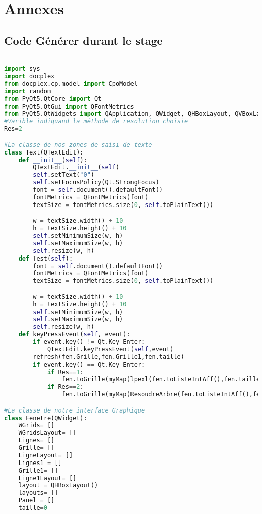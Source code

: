 \chapter{Annexes}

\section{Code Générer durant le stage}

\begin{lstlisting}[language=Python]

import sys
import docplex
from docplex.cp.model import CpoModel
import random
from PyQt5.QtCore import Qt
from PyQt5.QtGui import QFontMetrics
from PyQt5.QtWidgets import QApplication, QWidget, QHBoxLayout, QVBoxLayout, QLabel, QTextEdit
#Varible indiquand la méthode de resolution choisie
Res=2

#La classe de nos zones de saisi de texte
class Text(QTextEdit):
    def __init__(self):
        QTextEdit.__init__(self)
        self.setText("0")
        self.setFocusPolicy(Qt.StrongFocus)
        font = self.document().defaultFont()
        fontMetrics = QFontMetrics(font)
        textSize = fontMetrics.size(0, self.toPlainText())

        w = textSize.width() + 10
        h = textSize.height() + 10
        self.setMinimumSize(w, h)
        self.setMaximumSize(w, h)
        self.resize(w, h)
    def Test(self):
        font = self.document().defaultFont()
        fontMetrics = QFontMetrics(font)
        textSize = fontMetrics.size(0, self.toPlainText())

        w = textSize.width() + 10
        h = textSize.height() + 10
        self.setMinimumSize(w, h)
        self.setMaximumSize(w, h)
        self.resize(w, h)
    def keyPressEvent(self, event):
        if event.key() != Qt.Key_Enter:
            QTextEdit.keyPressEvent(self,event)
        refresh(fen.Grille,fen.Grille1,fen.taille)
        if event.key() == Qt.Key_Enter:
            if Res==1:
                fen.toGrille(myMap(lpexl(fen.toListeIntAff(),fen.taille),fen.taille))
            if Res==2:
                fen.toGrille(myMap(ResoudreArbre(fen.toListeIntAff(),fen.taille),fen.taille))

#La classe de notre interface Graphique
class Fenetre(QWidget):
    WGrids= []
    WGridsLayout= []
    Lignes= []
    Grille= []
    LigneLayout= []
    Lignes1 = []
    Grille1= []
    Ligne1Layout= []
    layout = QHBoxLayout()
    layouts= []
    Panel = []
    taille=0


\end{lstlisting}
